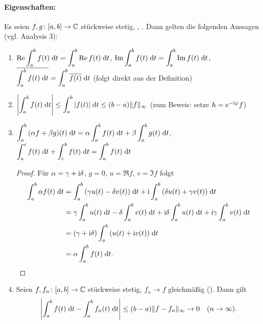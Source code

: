 \documentclass[a4paper,twoside,DIV15,BCOR12mm]{scrbook}
\begin{document}
\paragraph{Eigenschaften:} Es seien $f,g\colon[a,b]\to\mathbb{C}$ stückweise stetig, , \kmplx{\alpha,\beta}. Dann gelten die folgenden Aussagen (vgl. Analysis 3):
\begin{enumerate}
\item $\displaystyle \operatorname{Re}{\int_{a}^{b}{f(t)}\;\mathrm{d} t} = \int_{a}^{b}{\operatorname{Re}{f(t)}}\;\mathrm{d} t$, $\displaystyle \operatorname{Im}{\int_{a}^{b}{f(t)}\;\mathrm{d} t} = \int_{a}^{b}{\operatorname{Im}{f(t)}}\;\mathrm{d} t$, 
$\displaystyle \overline{\int_{a}^{b}{f(t)}\;\mathrm{d} t} = \int_{a}^{b}{\overline{f(t)}}\;\mathrm{d} t$ (folgt direkt aus der Definition)
\item $\displaystyle \left\lvert\int_{a}^{b}{f(t)}\;\mathrm{d} t\right\lvert \le \int_{a}^{b}{\left\lvert f(t)\right\lvert}\;\mathrm{d} t \le (b-a) \|f\|_\infty$ (zum Beweis: setze $h=\mathrm{e}^{-\mathrm{i}\varphi}f$)
\item $\displaystyle \int_{a}^{b}{(\alpha f + \beta g)(t)}\;\mathrm{d} t = \alpha \int_{a}^{b}{f(t)}\;\mathrm{d} t + \beta \int_{a}^{b}{g(t)}\;\mathrm{d} t$,
$\displaystyle \int_{a}^{c}{f(t)}\;\mathrm{d} t + \int_{c}^{b}{f(t)}\;\mathrm{d} t = \int_{a}^{b}{f(t)}\;\mathrm{d} t$
\begin{proof}
Für $\alpha = \gamma + \mathrm{i}\delta$, $g=0$, $u=\Re{f}$, $v=\Im{f}$ folgt
\begin{align*}
\int_{a}^{b}{\alpha f(t)}\;\mathrm{d} t &= \int_{a}^{b}{(\gamma u(t) - \delta v(t))}\;\mathrm{d} t + \mathrm{i} \int_{a}^{b}{(\delta u(t) + \gamma v(t))}\;\mathrm{d} t\\
&= \gamma \int_{a}^{b}{u(t)}\;\mathrm{d} t - \delta \int_{a}^{b}{v(t)}\;\mathrm{d} t + \mathrm{i}\delta \int_{a}^{b}{u(t)}\;\mathrm{d} t + \mathrm{i}\gamma \int_{a}^{b}{v(t)}\;\mathrm{d} t\\
&= (\gamma+\mathrm{i}\delta) \int_{a}^{b}{(u(t)+\mathrm{i} v(t))}\;\mathrm{d} t\\
&= \alpha \int_{a}^{b}{f(t)}\;\mathrm{d} t.\tag*{$\qedhere$}
\end{align*}
\end{proof}
\item Seien $f,f_n\colon[a,b]\to\mathbb{C}$ stückweise stetig, $f_n\to f$ gleichmäßig (\ninf). Dann gilt
\[\left\lvert\int_{a}^{b}{f(t)}\;\mathrm{d} t-\int_{a}^{b}{f_n(t)}\;\mathrm{d} t\right\lvert \le (b-a) \|f-f_n\|_\infty \to 0 \quad (n\rightarrow\infty).\]
\end{enumerate}
\end{document}
